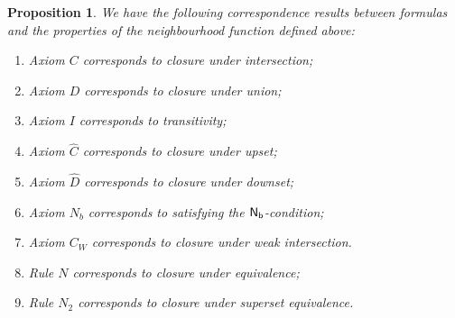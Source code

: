 \documentclass[12pt]{article}
\newtheorem{prop}[thm]{Proposition}
\begin{document}
\begin{prop}\label{4bprop}
We have the following correspondence results between formulas and the
properties of the neighbourhood function defined above:
\begin{enumerate}
\item[$ \bullet $] Axiom $C$ corresponds to closure under intersection;
\item[$ \bullet $] Axiom $D$ corresponds to closure under union;
\item[$ \bullet $] Axiom $I$ corresponds to transitivity;
\item[$ \bullet $] Axiom $\widehat{ C}$ corresponds to closure under upset;
\item[$ \bullet $] Axiom $\widehat{D}$ corresponds to closure under downset;
\item[$ \bullet $] Axiom $N_{b}$  corresponds to satisfying the $ {\sf N_{b} }$-condition;
\item[$ \bullet $] Axiom $C_{W}$  corresponds to closure under weak intersection.
\item[$ \bullet $] Rule $N$ corresponds to closure under equivalence;
\item[$ \bullet $] Rule $ N_{2 }$ corresponds to closure under superset equivalence.
\end{enumerate}
\end{prop}
\end{document}

